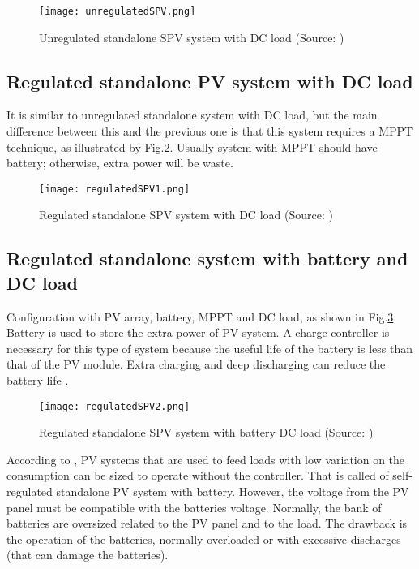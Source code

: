 \begin{figure}[h]
\texttt{[image: unregulatedSPV.png]}
\centering
\caption{Unregulated standalone SPV system with DC load (Source: \cite{Roy})}
\label{fig:unregSPV}
\end{figure}

\subsection{Regulated standalone PV system with DC load}
It is similar to unregulated standalone system with DC load, but the main difference between this and the previous one is that this system requires a MPPT technique, as illustrated by Fig.\ref{fig:regSPV1}. Usually system with MPPT should have battery; otherwise, extra power will be waste.

\begin{figure}[h]
\texttt{[image: regulatedSPV1.png]}
\centering
\caption{Regulated standalone SPV system with DC load (Source: \cite{Roy})}
\label{fig:regSPV1}
\end{figure}

\subsection{Regulated standalone system with battery and DC load}
Configuration with PV array, battery, MPPT and DC load, as shown in Fig.\ref{fig:regSPV2}. Battery is used to store the extra power of PV system. A charge controller is necessary for this type of system because the useful life of the battery is less than that of the PV module. Extra charging and deep discharging can reduce the battery life \cite{Kim}. 

\begin{figure}[h]
\texttt{[image: regulatedSPV2.png]}
\centering
\caption{Regulated standalone SPV system with battery DC load (Source: \cite{Roy})}
\label{fig:regSPV2}
\end{figure}

According to \cite{Pinho}, PV systems that are used to feed loads with low variation on the consumption can be sized to operate without the controller. That is called of self-regulated standalone PV system with battery. However, the voltage from the PV panel must be compatible with the batteries voltage. Normally, the bank of batteries are oversized related to the PV panel and to the load. The drawback is the operation of the batteries, normally overloaded or with excessive discharges (that can damage the batteries).

